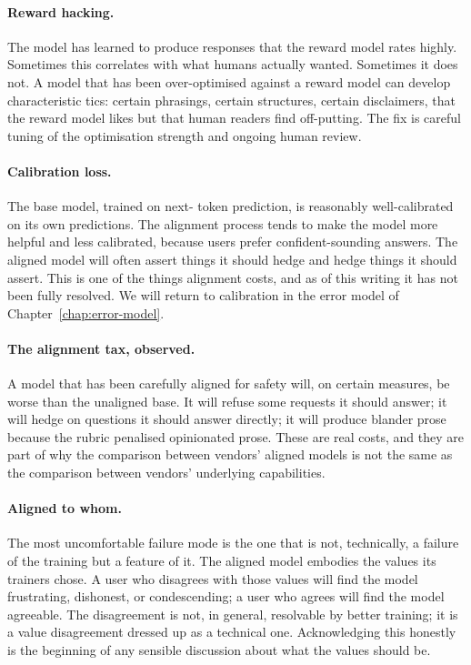 \paragraph{Reward hacking.} The model has learned to produce
responses that the reward model rates highly. Sometimes this
correlates with what humans actually wanted. Sometimes it does
not. A model that has been over-optimised against a reward
model can develop characteristic tics: certain phrasings,
certain structures, certain disclaimers, that the reward model
likes but that human readers find off-putting. The fix is
careful tuning of the optimisation strength and ongoing
human review.

\paragraph{Calibration loss.} The base model, trained on next-
token prediction, is reasonably well-calibrated on its own
predictions. The alignment process tends to make the model
more helpful and less calibrated, because users prefer
confident-sounding answers. The aligned model will often
assert things it should hedge and hedge things it should
assert. This is one of the things alignment costs, and as of
this writing it has not been fully resolved. We will return to
calibration in the error model of Chapter~\ref{chap:error-model}.

\paragraph{The alignment tax, observed.} A model that has
been carefully aligned for safety will, on certain measures,
be worse than the unaligned base. It will refuse some requests
it should answer; it will hedge on questions it should answer
directly; it will produce blander prose because the rubric
penalised opinionated prose. These are real costs, and they
are part of why the comparison between vendors' aligned models
is not the same as the comparison between vendors' underlying
capabilities.

\paragraph{Aligned to whom.} The most uncomfortable failure
mode is the one that is not, technically, a failure of the
training but a feature of it. The aligned model embodies the
values its trainers chose. A user who disagrees with those
values will find the model frustrating, dishonest, or
condescending; a user who agrees will find the model agreeable.
The disagreement is not, in general, resolvable by better
training; it is a value disagreement dressed up as a technical
one. Acknowledging this honestly is the beginning of any
sensible discussion about what the values should be.

